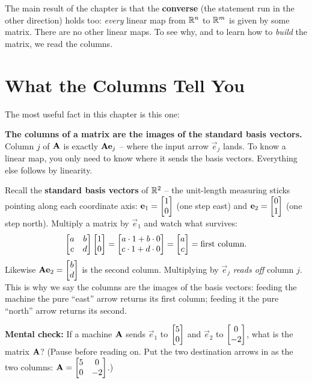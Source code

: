 The main result of the chapter is that the \textbf{converse} (the statement run
in the other direction) holds too: \emph{every}
linear map from $\mathbb{R}^n$ to $\mathbb{R}^m$ is given by some matrix. There are no other
linear maps. To see why, and to learn how to \emph{build} the
matrix, we read the columns.

\section{What the Columns Tell You}
\label{ch05:columns}

The most useful fact in this chapter is this one:

\begin{focusbox}
\textbf{The columns of a matrix are the images of the standard basis vectors.}
Column $j$ of $\mathbf{A}$ is exactly $\mathbf{A}\mathbf{e}_j$ -- where the input arrow
$\vec{e}_j$ lands. To know a linear map, you only need to know where it sends the
basis vectors. Everything else follows by linearity.
\end{focusbox}

Recall the \textbf{standard basis vectors} of $\mathbb{R}^2$ -- the unit-length measuring
sticks pointing along each coordinate axis: $\mathbf{e}_1 = \begin{bmatrix}1\\0\end{bmatrix}$ (one
step east) and $\mathbf{e}_2 = \begin{bmatrix}0\\1\end{bmatrix}$ (one step north). Multiply a matrix by
$\vec{e}_1$ and watch what survives:
\[
  \begin{bmatrix} a & b \\ c & d \end{bmatrix}\begin{bmatrix}1\\0\end{bmatrix}
  = \begin{bmatrix}a\cdot 1 + b \cdot 0 \\ c \cdot 1 + d \cdot 0\end{bmatrix}
  = \begin{bmatrix}a\\c\end{bmatrix} = \text{first column.}
\]
Likewise $\mathbf{A}\mathbf{e}_2 = \begin{bmatrix}b\\d\end{bmatrix}$ is the second column. Multiplying by
$\vec{e}_j$ \emph{reads off} column $j$. This is why we say the columns
are the images of the basis vectors: feeding the machine the pure ``east'' arrow
returns its first column; feeding it the pure ``north'' arrow returns its second.

\begin{recoverybox}
\textbf{Mental check:} If a machine $\mathbf{A}$ sends $\vec{e}_1$ to $\begin{bmatrix}5\\0\end{bmatrix}$
and $\vec{e}_2$ to $\begin{bmatrix}0\\-2\end{bmatrix}$, what is the matrix $\mathbf{A}$?
(Pause before reading on. Put the two destination arrows in as the two
columns: $\mathbf{A} = \begin{bmatrix} 5 & 0 \\ 0 & -2 \end{bmatrix}$.)
\end{recoverybox}

